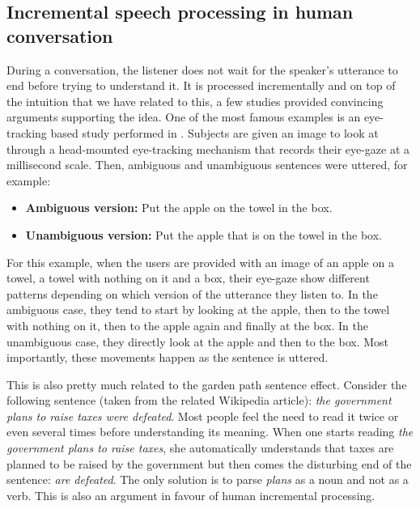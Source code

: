	\subsection{Incremental speech processing in human conversation}
	\label{soa:inchuman}

           During a conversation, the listener does not wait for the speaker's utterance to end before trying to understand it. It is processed incrementally and on top of the intuition that we have related to this, a few studies provided convincing arguments supporting the idea. One of the most famous examples is an eye-tracking based study performed in \cite{Tanenhaus1995}. Subjects are given an image to look at through a head-mounted eye-tracking mechanism that records their eye-gaze at a millisecond scale. Then, ambiguous and unambiguous sentences were uttered, for example:

           \begin{itemize}
             \item \textbf{Ambiguous version:} Put the apple on the towel in the box.
             \item \textbf{Unambiguous version:} Put the apple that is on the towel in the box.
           \end{itemize}

           For this example, when the users are provided with an image of an apple on a towel, a towel with nothing on it and a box, their eye-gaze show different patterns depending on which version of the utterance they listen to. In the ambiguous case, they tend to start by looking at the apple, then to the towel with nothing on it, then to the apple again and finally at the box. In the unambiguous case, they directly look at the apple and then to the box. Most importantly, these movements happen as the sentence is uttered.

           This is also pretty much related to the garden path sentence effect. Consider the following sentence (taken from the related Wikipedia article): \textit{the government plans to raise taxes were defeated}. Most people feel the need to read it twice or even several times before understanding its meaning. When one starts reading \textit{the government plans to raise taxes}, she automatically understands that taxes are planned to be raised by the government but then comes the disturbing end of the sentence: \textit{are defeated}. The only solution is to parse \textit{plans} as a noun and not as a verb. This is also an argument in favour of human incremental processing.

